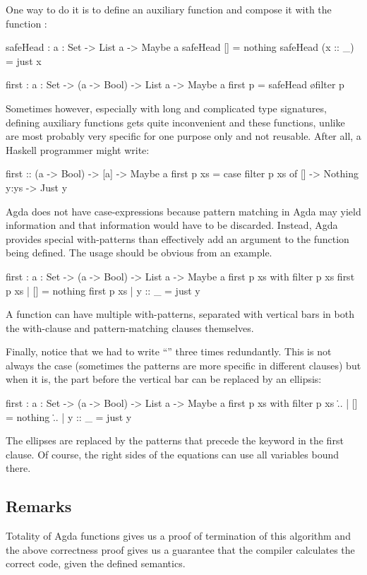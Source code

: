 One way to do it is to define an auxiliary function and compose it with the function
:
\begin{code}
  safeHead : {a : Set} -> List a -> Maybe a
  safeHead [] = nothing
  safeHead (x :: _) = just x
  
  first : {a : Set} -> (a -> Bool) -> List a -> Maybe a
  first p = safeHead \o filter p
\end{code}
Sometimes however, especially with long and complicated type signatures,
defining auxiliary functions gets quite inconvenient and these functions,
unlike  are most probably very specific for one purpose only
and not reusable. After all, a Haskell programmer might write:
\begin{code}
  first :: (a -> Bool) -> [a] -> Maybe a
  first p xs = case filter p xs of
    [] -> Nothing
    y:ys -> Just y
\end{code}
Agda does not have case-expressions because pattern matching in Agda may yield
information and that information would have to be discarded. Instead, Agda provides special
with-patterns than effectively add an argument to the function being defined. The
usage should be obvious from an example.
\begin{code}
  first : {a : Set} -> (a -> Bool) -> List a -> Maybe a
  first p xs with filter p xs
  first p xs | [] = nothing
  first p xs | y :: _ = just y
\end{code}
A function can have multiple with-patterns, separated with vertical bars in both the
with-clause and pattern-matching clauses themselves.

Finally, notice that we had to write ``'' three times redundantly.
This is not always the case (sometimes the patterns are more specific in different
clauses) but when it is, the part before the vertical bar can be replaced by an ellipsis:
\begin{code}
  first : {a : Set} -> (a -> Bool) -> List a -> Maybe a
  first p xs with filter p xs
  \... | [] = nothing
  \... | y :: _ = just y
\end{code}
The ellipses are replaced by the patterns that precede the keyword  in the first
clause. Of course, the right sides of the equations can use all variables bound
there.

\subsection{Remarks}

Totality of Agda functions gives us a proof of termination of this algorithm and
the above correctness proof gives us a guarantee that the compiler calculates
the correct code, given the defined semantics.

